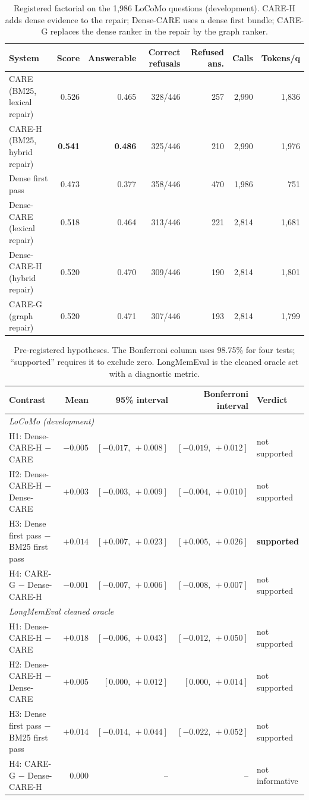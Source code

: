 \documentclass[10pt]{article}
\theoremstyle{plain}
\newcommand{\care}{\textsc{CARE}}
\begin{document}
\begin{table}[t]
\centering
\caption{Registered factorial on the 1,986 LoCoMo questions (development). CARE-H adds dense evidence to the repair;
Dense-CARE uses a dense first bundle; CARE-G replaces the dense ranker in the repair by the graph ranker.}
\label{tab:factorial}
\small
\begin{tabular}{lrrrrrr}
\toprule
System & Score & Answerable & Correct refusals & Refused ans. & Calls & Tokens/q \\
\midrule
\care{} (BM25, lexical repair) & 0.526 & 0.465 & 328/446 & 257 & 2,990 & 1,836 \\
CARE-H (BM25, hybrid repair) & \textbf{0.541} & \textbf{0.486} & 325/446 & 210 & 2,990 & 1,976 \\
Dense first pass & 0.473 & 0.377 & 358/446 & 470 & 1,986 & 751 \\
Dense-CARE (lexical repair) & 0.518 & 0.464 & 313/446 & 221 & 2,814 & 1,681 \\
Dense-CARE-H (hybrid repair) & 0.520 & 0.470 & 309/446 & 190 & 2,814 & 1,801 \\
CARE-G (graph repair) & 0.520 & 0.471 & 307/446 & 193 & 2,814 & 1,799 \\
\bottomrule
\end{tabular}
\end{table}

\begin{table}[t]
\centering
\caption{Pre-registered hypotheses. The Bonferroni column uses 98.75\% for four tests; ``supported'' requires it to
exclude zero. LongMemEval is the cleaned oracle set with a diagnostic metric.}
\label{tab:hyp}
\small
\begin{tabular}{lrrrl}
\toprule
Contrast & Mean & 95\% interval & Bonferroni interval & Verdict \\
\midrule
\multicolumn{5}{l}{\emph{LoCoMo (development)}} \\
H1: Dense-CARE-H $-$ CARE & $-0.005$ & $[-0.017,\ +0.008]$ & $[-0.019,\ +0.012]$ & not supported \\
H2: Dense-CARE-H $-$ Dense-CARE & $+0.003$ & $[-0.003,\ +0.009]$ & $[-0.004,\ +0.010]$ & not supported \\
H3: Dense first pass $-$ BM25 first pass & $+0.014$ & $[+0.007,\ +0.023]$ & $[+0.005,\ +0.026]$ & \textbf{supported} \\
H4: CARE-G $-$ Dense-CARE-H & $-0.001$ & $[-0.007,\ +0.006]$ & $[-0.008,\ +0.007]$ & not supported \\
\midrule
\multicolumn{5}{l}{\emph{LongMemEval cleaned oracle}} \\
H1: Dense-CARE-H $-$ CARE & $+0.018$ & $[-0.006,\ +0.043]$ & $[-0.012,\ +0.050]$ & not supported \\
H2: Dense-CARE-H $-$ Dense-CARE & $+0.005$ & $[0.000,\ +0.012]$ & $[0.000,\ +0.014]$ & not supported \\
H3: Dense first pass $-$ BM25 first pass & $+0.014$ & $[-0.014,\ +0.044]$ & $[-0.022,\ +0.052]$ & not supported \\
H4: CARE-G $-$ Dense-CARE-H & $0.000$ & -- & -- & not informative \\
\bottomrule
\end{tabular}
\end{table}
\end{document}
